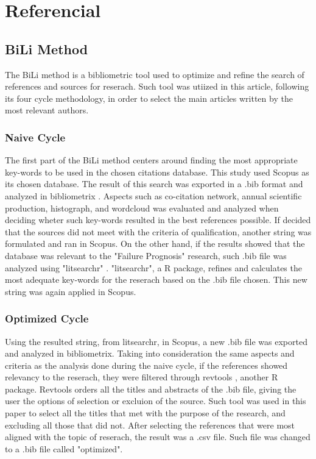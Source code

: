\section{Referencial}

\subsection{BiLi Method}
The BiLi method is a bibliometric tool used to optimize and refine the search of references and sources for reserach. Such tool was utiized in this article, following its four cycle methodology, in order to select the main articles written by the most relevant authors.

\subsubsection{Naive Cycle}
The first part of the BiLi method centers around finding the most appropriate key-words to be used in the chosen citations database. This study used Scopus as its chosen database.
The result of this search was exported in a .bib format and analyzed in bibliometrix \cite{biblio2017}. Aspects such as co-citation network, annual scientific production,  histograph, and wordcloud was evaluated and analyzed when deciding wheter such key-words resulted in the best references possible.
If decided that the sources did not meet with the criteria of qualification, another string was formulated and ran in Scopus.
On the other hand, if the results showed that the database was relevant to the "Failure Prognosis" research, such .bib file was analyzed using "litsearchr" \cite{grames2019automated}.
"litsearchr", a R package, refines and calculates the most adequate key-words for the reserach based on the .bib file chosen. This new string was again applied in Scopus.

\subsubsection{Optimized Cycle}
Using the resulted string, from litsearchr, in Scopus, a new .bib file was exported and analyzed in bibliometrix. Taking into consideration the same aspects and criteria as the analysis done during the naive cycle, if the references showed relevancy to the reserach, they were filtered through revtools \cite{westgate2019revtools}, another R package.
Revtools orders all the titles and abstracts of the .bib file, giving the user the options of selection or excluion of the source. Such tool was used in this paper to select all the titles that met with the purpose of the research, and excluding all those that did not.
After selecting the references that were most aligned with the topic of reserach, the result was a .csv file. Such file was changed to a .bib file called "optimized".

